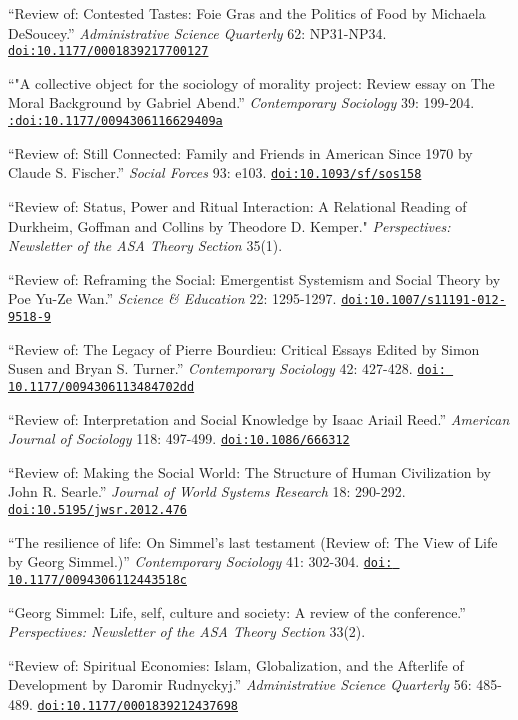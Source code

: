 
\ind ``Review of: Contested Tastes: Foie Gras and the Politics of Food by Michaela DeSoucey.'' {\em Administrative Science Quarterly} 62: NP31-NP34. \href{https://doi.org/10.1177/0001839217700127}{\nolinkurl{doi:10.1177/0001839217700127}}

\ind ``"A collective object for the sociology of morality project: Review essay on The Moral Background by Gabriel Abend.'' {\em Contemporary Sociology} 39: 199-204.  \href{https://doi.org/10.1177/0094306116629409a}{\nolinkurl{:doi:10.1177/0094306116629409a}}

\ind ``Review of: Still Connected: Family and Friends in American Since 1970 by Claude S. Fischer.'' {\em Social Forces} 93: e103. \href{https://doi.org/10.1093/sf/sos158}{\nolinkurl{doi:10.1093/sf/sos158}}

\ind ``Review of: Status, Power and Ritual Interaction: A Relational Reading of Durkheim, Goffman and Collins by Theodore D. Kemper." {\em Perspectives: Newsletter of the ASA Theory Section} 35(1).

\ind ``Review of: Reframing the Social: Emergentist Systemism and Social Theory by Poe Yu-Ze Wan.'' {\em Science \& Education} 22: 1295-1297. \href{https://doi.org/10.1007/s11191-012-9518-9}{\nolinkurl{doi:10.1007/s11191-012-9518-9}}

\ind ``Review of: The Legacy of Pierre Bourdieu: Critical Essays Edited by Simon Susen and Bryan S. Turner.'' {\em Contemporary Sociology} 42: 427-428. \href{https://doi.org/10.1177/0094306113484702dd}{\nolinkurl{doi: 10.1177/0094306113484702dd}}

\ind ``Review of: Interpretation and Social Knowledge by Isaac Ariail Reed.'' {\em American Journal of Sociology} 118: 497-499. \href{https://doi.org/10.1086/666312}{\nolinkurl{doi:10.1086/666312}}

\ind ``Review of: Making the Social World: The Structure of Human Civilization by John R. Searle.'' {\em Journal of World Systems Research} 18: 290-292. \href{https://doi.org/10.5195/jwsr.2012.476}{\nolinkurl{doi:10.5195/jwsr.2012.476}}

\ind ``The resilience of life: On Simmel's last testament (Review of: The View of Life by Georg Simmel.)'' {\em Contemporary Sociology} 41: 302-304. \href{https://doi.org/10.1177/0094306112443518c}{\nolinkurl{doi: 10.1177/0094306112443518c}}

\ind  ``Georg Simmel: Life, self, culture and society: A review of the conference.''  {\em Perspectives: Newsletter of the ASA Theory Section} 33(2).

\ind ``Review of:  Spiritual Economies: Islam, Globalization, and the Afterlife of Development by Daromir Rudnyckyj.'' {\em Administrative Science Quarterly} 56: 485-489. \href{https://doi.org/10.1177/0001839212437698}{\nolinkurl{doi:10.1177/0001839212437698}}
